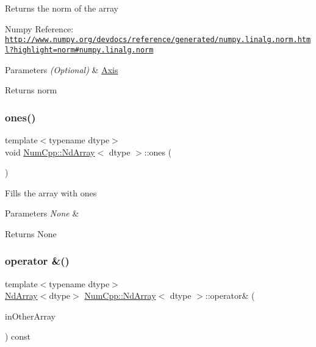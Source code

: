 Returns the norm of the array

Numpy Reference\+: \href{http://www.numpy.org/devdocs/reference/generated/numpy.linalg.norm.html?highlight=norm#numpy.linalg.norm}{\tt http\+://www.\+numpy.\+org/devdocs/reference/generated/numpy.\+linalg.\+norm.\+html?highlight=norm\#numpy.\+linalg.\+norm}


\begin{DoxyParams}{Parameters}
{\em (\+Optional)} & \mbox{\hyperlink{struct_num_cpp_1_1_axis}{Axis}} \\
\hline
\end{DoxyParams}
\begin{DoxyReturn}{Returns}
norm 
\end{DoxyReturn}
\mbox{\label{class_num_cpp_1_1_nd_array_a66c340aa91606a937186a1f9f5b6c4cf}} 
\subsubsection{\texorpdfstring{ones()}{ones()}}
{\footnotesize\ttfamily template$<$typename dtype$>$ \\
void \mbox{\hyperlink{class_num_cpp_1_1_nd_array}{Num\+Cpp\+::\+Nd\+Array}}$<$ dtype $>$\+::ones (\begin{DoxyParamCaption}{ }\end{DoxyParamCaption})\hspace{0.3cm}{\ttfamily [inline]}}

Fills the array with ones


\begin{DoxyParams}{Parameters}
{\em None} & \\
\hline
\end{DoxyParams}
\begin{DoxyReturn}{Returns}
None 
\end{DoxyReturn}
\mbox{\label{class_num_cpp_1_1_nd_array_affb2d174578a36e5f3d87df2bfe3522a}} 
\subsubsection{\texorpdfstring{operator \&()}{operator \&()}\hspace{0.1cm}{\footnotesize\ttfamily [1/2]}}
{\footnotesize\ttfamily template$<$typename dtype$>$ \\
\mbox{\hyperlink{class_num_cpp_1_1_nd_array}{Nd\+Array}}$<$dtype$>$ \mbox{\hyperlink{class_num_cpp_1_1_nd_array}{Num\+Cpp\+::\+Nd\+Array}}$<$ dtype $>$\+::operator\& (\begin{DoxyParamCaption}\item[{const \mbox{\hyperlink{class_num_cpp_1_1_nd_array}{Nd\+Array}}$<$ dtype $>$ \&}]{in\+Other\+Array }\end{DoxyParamCaption}) const\hspace{0.3cm}{\ttfamily [inline]}}

